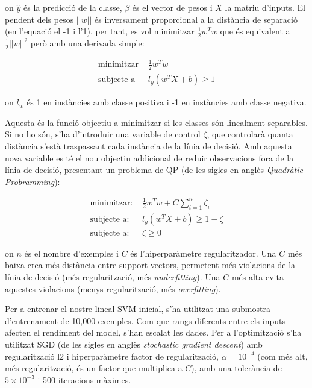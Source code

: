 \documentclass[12pt, spanish]{article}
\begin{document}
on $\hat{y}$ és la predicció de la classe, $\beta$ és el vector de pesos i $X$ la matriu d'inputs. El pendent dels pesos $||w||$ és inversament proporcional a la distància de separació (en l'equació el -1 i l'1), per tant, es vol minimitzar $ \frac{1}{2} w^T w$ que és equivalent a $ \frac{1}{2}||w||^2$ però amb una derivada simple:


\begin{equation} 
\begin{split}
\text{minimitzar } & \frac{1}{2} w^T w \\
\text{subjecte a }&  l_y (w^T X + b) \ge 1
\end{split}
\end{equation}

on $l_w$ és 1 en instàncies amb classe positiva i -1 en instàncies amb classe negativa.

Aquesta és la funció objectiu a minimitzar si les classes són linealment separables. Si no ho són, s'ha d'introduir una variable de control $\zeta$, que controlarà quanta distància s'està traspassant cada instància de la línia de decisió. Amb aquesta nova variable es té el nou objectiu addicional de reduir observacions fora de la línia de decisió, presentant un problema de QP (de les sigles en anglès \textit{Quadràtic Probramming}):

\begin{equation} 
\begin{split}
\text{minimitzar: } & \frac{1}{2} w^T w + C \sum^n_{i = 1} \zeta_i \\
\text{subjecte a: }&  l_y (w^T X + b) \ge 1 - \zeta \\
\text{subjecte a: }& \zeta \ge 0
\end{split}
\end{equation}

on $n$ és el nombre d'exemples i $C$ és l'hiperparàmetre regularitzador. Una $C$ més baixa crea més distància entre support vectors, permetent més violacions de la línia de decisió (més regularització, més \textit{underfitting}). Una $C$ més alta evita aquestes violacions (menys regularització, més \textit{overfitting}). 

Per a entrenar el nostre lineal SVM inicial, s'ha utilitzat una submostra d'entrenament de 10,000 exemples. Com que rangs diferents entre els inputs afecten el rendiment del model, s'han escalat les dades. Per a l'optimització s'ha utilitzat SGD (de les sigles en anglès \textit{stochastic gradient descent}) amb regularització l2 i hiperparàmetre factor de regularització, $\alpha = 10^{-4}$ (com més alt, més regularització, és un factor que multiplica a $C$), amb una tolerància de $5 \times 10^{-3}$ i 500 iteracions màximes.
\end{document}
